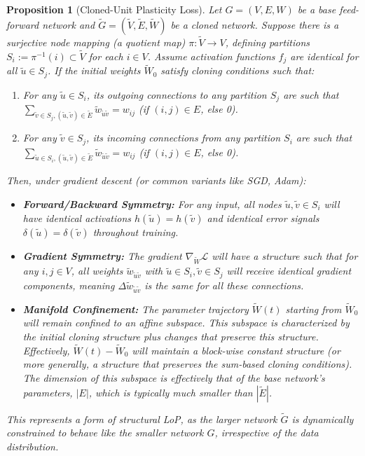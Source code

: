 \documentclass{article}
\newcommand{\Loss}{\mathcal{L}}
\newtheorem{proposition}{Proposition}[section]
\begin{document}
\begin{proposition}[Cloned-Unit Plasticity Loss]
\label{prop:cloned}
Let $G=(V,E,W)$ be a \emph{base} feed-forward network and $\widetilde{G}=(\widetilde{V},\widetilde{E},\widetilde{W})$ be a \emph{cloned} network. Suppose there is a surjective node mapping (a quotient map) $\pi: \widetilde{V} \to V$, defining partitions $S_i := \pi^{-1}(i) \subset \widetilde{V}$ for each $i \in V$. Assume activation functions $f_j$ are identical for all $\widetilde{u} \in S_j$.
If the initial weights $\widetilde{W}_0$ satisfy \emph{cloning conditions} such that:
\begin{enumerate}[label=(\roman*)]
    \item For any $\widetilde{u} \in S_i$, its outgoing connections to any partition $S_j$ are such that $\sum_{\widetilde{v} \in S_j, (\widetilde{u},\widetilde{v}) \in \widetilde{E}} \widetilde{w}_{\widetilde{u}\widetilde{v}} = w_{ij}$ (if $(i,j) \in E$, else 0).
    \item For any $\widetilde{v} \in S_j$, its incoming connections from any partition $S_i$ are such that $\sum_{\widetilde{u} \in S_i, (\widetilde{u},\widetilde{v}) \in \widetilde{E}} \widetilde{w}_{\widetilde{u}\widetilde{v}} = w_{ij}$ (if $(i,j) \in E$, else 0).
\end{enumerate}
Then, under gradient descent (or common variants like SGD, Adam):
\begin{itemize}
    \item \textbf{Forward/Backward Symmetry:} For any input, all nodes $\widetilde{u}, \widetilde{v} \in S_i$ will have identical activations $h(\widetilde{u})=h(\widetilde{v})$ and identical error signals $\delta(\widetilde{u})=\delta(\widetilde{v})$ throughout training.
    \item \textbf{Gradient Symmetry:} The gradient $\nabla_{\widetilde{W}}\Loss$ will have a structure such that for any $i, j \in V$, all weights $\widetilde{w}_{\widetilde{u}\widetilde{v}}$ with $\widetilde{u} \in S_i, \widetilde{v} \in S_j$ will receive identical gradient components, meaning $\Delta \widetilde{w}_{\widetilde{u}\widetilde{v}}$ is the same for all these connections.
    \item \textbf{Manifold Confinement:} The parameter trajectory $\widetilde{W}(t)$ starting from $\widetilde{W}_0$ will remain confined to an affine subspace. This subspace is characterized by the initial cloning structure plus changes that preserve this structure. Effectively, $\widetilde{W}(t) - \widetilde{W}_0$ will maintain a block-wise constant structure (or more generally, a structure that preserves the sum-based cloning conditions). The dimension of this subspace is effectively that of the base network's parameters, $|E|$, which is typically much smaller than $|\widetilde{E}|$.
\end{itemize}
This represents a form of \emph{structural} LoP, as the larger network $\widetilde{G}$ is dynamically constrained to behave like the smaller network $G$, irrespective of the data distribution.
\end{proposition}
\end{document}
